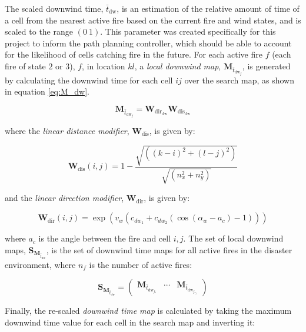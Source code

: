 \documentclass[conference]{IEEEtran}
\begin{document}
The scaled downwind time, $\bar{t}_{\text{dw}}$, is an estimation of the relative amount of time of a cell from the nearest active fire based on the current fire and wind states, and is scaled to the range $(0~1)$.
This parameter was created specifically for this project to inform the path planning controller, which should be able to account for the likelihood of cells catching fire in the future.
For each active fire $f$ (each fire of state $2$ or $3$), $f$, in location $kl$, a \textit{local downwind map}, $\bm{M}_{\bar{t}_{\text{dw}_{f}}}$, is generated by calculating the downwind time for each cell $ij$ over the search map, as shown in equation \ref{eq:M_dw}.

\begin{equation} \label{eq:M_dw}
    \bm{M}_{\bar{t}_{\text{dw}_{f}}} = \bm{W}_{\text{dir}_{\text{dw}}} \bm{W}_{\text{dis}_{\text{dw}}}
\end{equation}

where the \textit{linear distance modifier}, $\bm{W}_{\text{dis}}$, is given by:
 
\begin{equation}
    \bm{W}_{\text{dis}}(i,j) = 
    1 - \frac{\sqrt{((k-i)^2 + (l-j)^2)}}{\sqrt{(n_x^2 + n_y^2)}}
\end{equation}

and the \textit{linear direction modifier}, $\bm{W}_{\text{dir}}$, is given by:

\begin{equation}
    \bm{W}_{\text{dir}}(i,j) = 
    \exp (v_{w} (c_{dw_{1}} + c_{dw_{2}} ( \cos( \alpha_{w} - a_{c})-1)) )
\end{equation}

where $a_{c}$ is the angle between the fire and cell $i,j$.
The set of local downwind maps, $\bm{S}_{\bm{M}_{\bar{t}_{\text{dw}}}}$, is the set of downwind time maps for all active fires in the disaster environment, where $n_{f}$ is the number of active fires:

\begin{equation} \label{eq:S_M_t_dw}
    \bm{S}_{\bm{M}_{\bar{t}_{\text{dw}}}} = 
    \begin{pmatrix}
        \bm{M}_{\bar{t}_{\text{dw}_{f_{1}}}} & \cdots & \bm{M}_{\bar{t}_{\text{dw}_{f_{n_{f}}}}}
    \end{pmatrix}
\end{equation}

Finally, the re-scaled \textit{downwind time map} is calculated by taking the maximum downwind time value for each cell in the search map and inverting it:
\end{document}
